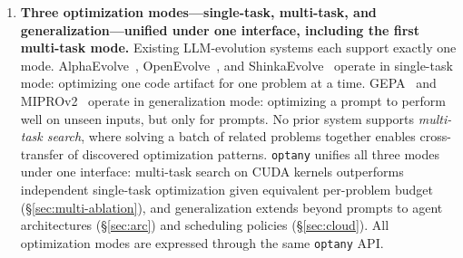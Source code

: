 \documentclass[sigconf,anonymous,review]{acmart}
\newcommand{\oa}{\texttt{optany}}
\begin{document}
\begin{enumerate}[leftmargin=*,itemsep=2pt]
\item \textbf{Three optimization modes---single-task, multi-task, and generalization---unified under one interface, including the first multi-task mode.} Existing LLM-evolution systems each support exactly one mode. AlphaEvolve~\cite{alphaevolve2025}, OpenEvolve~\cite{openevolve2025}, and ShinkaEvolve~\cite{shinkaevolve2025} operate in single-task mode: optimizing one code artifact for one problem at a time. GEPA~\cite{agrawal2026gepa} and MIPROv2~\cite{opsahl2024miprov2} operate in generalization mode: optimizing a prompt to perform well on unseen inputs, but only for prompts. No prior system supports \emph{multi-task search}, where solving a batch of related problems together enables cross-transfer of discovered optimization patterns. \oa{} unifies all three modes under one interface: multi-task search on CUDA kernels outperforms independent single-task optimization given equivalent per-problem budget (\S\ref{sec:multi-ablation}), and generalization extends beyond prompts to agent architectures (\S\ref{sec:arc}) and scheduling policies (\S\ref{sec:cloud}). All optimization modes are expressed through the same \oa{} API.


\end{enumerate}
\end{document}
